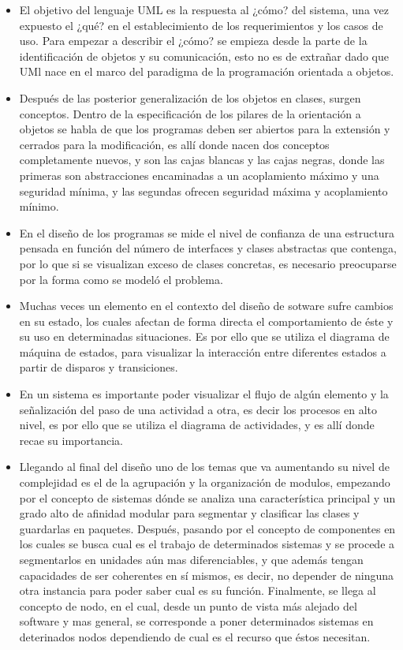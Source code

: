 \begin{itemize}
	\item El objetivo del lenguaje UML es la respuesta al ¿cómo? del sistema, una vez expuesto el ¿qué? en el establecimiento de los requerimientos y los casos de uso. Para empezar a describir el ¿cómo? se empieza desde la parte de la identificación de objetos y su comunicación, esto no es de extrañar dado que UMl nace en el marco del paradigma de la programación orientada a objetos.
	
	\item Después de las posterior generalización de los objetos en clases, surgen conceptos. Dentro de la especificación de los pilares de la orientación a objetos se habla de que los programas deben ser abiertos para la extensión y cerrados para la modificación, es allí donde nacen dos conceptos completamente nuevos, y son las cajas blancas y las cajas negras, donde las primeras son abstracciones encaminadas a un acoplamiento máximo y una seguridad mínima, y las segundas ofrecen seguridad máxima y acoplamiento mínimo.
	
	\item En el diseño de los programas se mide el nivel de confianza de una estructura pensada en función del número de interfaces y clases abstractas que contenga, por lo que si se visualizan exceso de clases concretas, es necesario preocuparse por la forma como se modeló el problema.
	
	\item Muchas veces un elemento en el contexto del diseño de sotware sufre cambios en su estado, los cuales afectan de forma directa el comportamiento de éste y su uso en determinadas situaciones. Es por ello que se utiliza el diagrama de máquina de estados, para visualizar la interacción entre diferentes estados a partir de disparos y transiciones.
	
	\item En un sistema es importante poder visualizar el flujo de algún elemento y la señalización del paso de una actividad a otra, es decir los procesos en alto nivel, es por ello que se utiliza el diagrama de actividades, y es allí donde recae su importancia.
	
	\item Llegando al final del diseño uno de los temas que va aumentando su nivel de complejidad es el de la agrupación y la organización de modulos, empezando por el concepto de sistemas dónde se analiza una característica principal y un grado alto de afinidad modular para segmentar y clasificar las clases y guardarlas en paquetes. Después, pasando por el concepto de componentes en los cuales se busca cual es el trabajo de determinados sistemas y se procede a segmentarlos en unidades aún mas diferenciables, y que además tengan capacidades de ser coherentes en sí mismos, es decir, no depender de ninguna otra instancia para poder saber cual es su función. Finalmente, se llega al concepto de nodo, en el cual, desde un punto de vista más alejado del software y mas general, se corresponde a poner determinados sistemas en deterinados nodos dependiendo de cual es el recurso que éstos necesitan.
	

\end{itemize}
